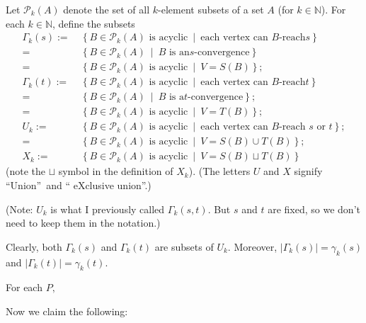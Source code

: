 \documentclass[numbers=enddot,12pt,final,onecolumn,notitlepage]{scrartcl}%
\theoremstyle{definition}
\theoremstyle{plainsl}
\begin{document}
Let $\mathcal{P}_{k}\left(  A\right)  $ denote the set of all $k$-element
subsets of a set $A$ (for $k\in\mathbb{N}$). For each $k\in\mathbb{N}$, define
the subsets
\begin{align*}
\Gamma_{k}\left(  s\right)  :=  &  \ \left\{  B\in\mathcal{P}_{k}\left(
A\right)  \text{ is acyclic}\ \mid\ \text{each vertex can }B\text{-reach
}s\right\} \\
=  &  \ \left\{  B\in\mathcal{P}_{k}\left(  A\right)  \ \mid\ B\text{ is an
}s\text{-convergence}\right\} \\
=  &  \ \left\{  B\in\mathcal{P}_{k}\left(  A\right)  \text{ is acyclic}
\ \mid\ V=S\left(
B\right)  \right\}  ;\\
\Gamma_{k}\left(  t\right)  :=  &  \ \left\{  B\in\mathcal{P}_{k}\left(
A\right)  \text{ is acyclic}\ \mid\ \text{each vertex can }B\text{-reach
}t\right\} \\
=  &  \ \left\{  B\in\mathcal{P}_{k}\left(  A\right)  \ \mid\ B\text{ is a
}t\text{-convergence}\right\}  ;\\
=  &  \ \left\{  B\in\mathcal{P}_{k}\left(  A\right)  \text{ is acyclic}
\ \mid\ V=T\left(
B\right)  \right\}  ;\\
U_{k}:=  &  \ \left\{  B\in\mathcal{P}_{k}\left(  A\right)  \text{ is
acyclic}\ \mid\ \text{each vertex can }B\text{-reach }s\text{ or }t\right\}
;\\
=  &  \ \left\{  B\in\mathcal{P}_{k}\left(  A\right)  \text{ is acyclic}
\ \mid\ V=S\left(
B\right)  \cup T\left(  B\right)  \right\}  ;\\
X_{k}:=  &  \ \left\{  B\in\mathcal{P}_{k}\left(  A\right)  \text{ is acyclic}
\ \mid\ V=S\left(
B\right)  \sqcup T\left(  B\right)  \right\}
\end{align*}
(note the $\sqcup$ symbol in the definition of $X_{k}$). (The letters $U$ and
$X$ signify \textquotedblleft Union\textquotedblright\ and \textquotedblleft
eXclusive union\textquotedblright.)

(Note: $U_{k}$ is what I previously called $\Gamma_{k}\left(  s,t\right)  $.
But $s$ and $t$ are fixed, so we don't need to keep them in the notation.)

Clearly, both $\Gamma_{k}\left(  s\right)  $ and $\Gamma_{k}\left(  t\right)
$ are subsets of $U_{k}$. Moreover, $\left\vert \Gamma_{k}\left(  s\right)
\right\vert =\gamma_{k}\left(  s\right)  $ and $\left\vert \Gamma_{k}\left(
t\right)  \right\vert =\gamma_{k}\left(  t\right)  $.

For each $P,$

Now we claim the following:
\end{document}
